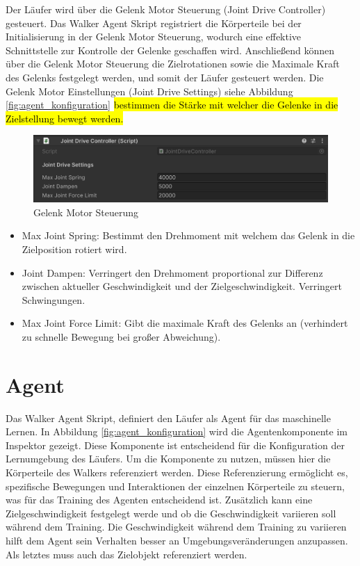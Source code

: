Der Läufer wird über die Gelenk Motor Steuerung (Joint Drive Controller) gesteuert. Das Walker Agent Skript registriert die Körperteile bei der Initialisierung in der Gelenk Motor Steuerung, wodurch eine effektive Schnittstelle zur Kontrolle der Gelenke geschaffen wird. Anschließend können über die Gelenk Motor Steuerung die Zielrotationen sowie die Maximale Kraft des Gelenks festgelegt werden, und somit der Läufer gesteuert werden. Die Gelenk Motor Einstellungen (Joint Drive Settings) siehe Abbildung \ref{fig:agent_konfiguration} \hl{bestimmen die Stärke mit welcher die Gelenke in die Zielstellung bewegt werden.}

\begin{figure}[H]
  \centering  
  \includegraphics[scale=0.5]{img/gelenk_motor_steuerung.png}
  \caption{Gelenk Motor Steuerung}
  \label{fig:gelenk_motor_steuerung}
\end{figure}

\begin{itemize}
  \item Max Joint Spring: Bestimmt den Drehmoment mit welchem das Gelenk in die Zielposition rotiert wird.
  \item Joint Dampen: Verringert den Drehmoment proportional zur Differenz zwischen aktueller Geschwindigkeit und der Zielgeschwindigkeit. Verringert Schwingungen.
  \item Max Joint Force Limit: Gibt die maximale Kraft des Gelenks an (verhindert zu schnelle Bewegung bei großer Abweichung).
\end{itemize}


\section{Agent}
Das Walker Agent Skript, definiert den Läufer als Agent für das maschinelle Lernen. In Abbildung \ref{fig:agent_konfiguration} wird die Agentenkomponente im Inspektor gezeigt. Diese Komponente ist entscheidend für die Konfiguration der Lernumgebung des Läufers. Um die Komponente zu nutzen, müssen hier die Körperteile des Walkers referenziert werden. Diese Referenzierung ermöglicht es, spezifische Bewegungen und Interaktionen der einzelnen Körperteile zu steuern, was für das Training des Agenten entscheidend ist. Zusätzlich kann eine Zielgeschwindigkeit festgelegt werde und ob die Geschwindigkeit variieren soll während dem Training. Die Geschwindigkeit während dem Training zu variieren hilft dem Agent sein Verhalten besser an Umgebungsveränderungen anzupassen. Als letztes muss auch das Zielobjekt referenziert werden.

